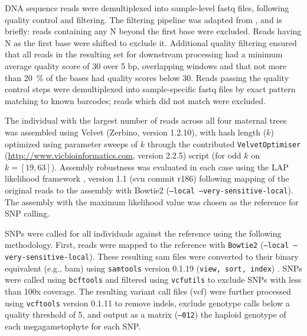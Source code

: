 \documentclass[smallextended]{svjour3}
\begin{document}
DNA sequence reads were demultiplexed into sample-level fastq files, following
quality control and filtering.  The filtering pipeline was adapted from
\citep{Friedline:2012fm}, and is briefly: reads containing any N beyond the
first base were excluded. Reads having N as the first base were shifted to
exclude it.  Additional quality filtering ensured that all reads in the
resulting set for downstream processing had a minimum average quality score of
30 over 5 bp, overlapping windows and that not more than \SI{20}{\percent} of
the bases had quality scores below 30. Reads passing the quality control steps
were demultiplexed into sample-specific fastq files by exact pattern matching to
known barcodes; reads which did not match were excluded.

The individual with the largest number of reads across all four maternal trees
was assembled using Velvet (Zerbino, version 1.2.10), with hash length ($k$)
optimized using parameter sweeps of $k$ through the contributed
\texttt{VelvetOptimiser} (\url{http://www.vicbioinformatics.com}, version 2.2.5)
script (for odd $k$ on $k=[19,63]$).  Assembly robustness was evaluated in each
case using the LAP likelihood framework \citep{Ghodsi:2013bc}, version 1.1 (svn
commit r186) following mapping of the original reads to the assembly with
Bowtie2 \citep{Langmead:2012jh} (\texttt{--local --very-sensitive-local}).  The
assembly with the maximum likelihood value was chosen as the reference for SNP
calling.

SNPs were called for all individuals against the reference using the following
methodology.  First, reads were mapped to the reference with \texttt{Bowtie2}
(\texttt{--local --very-sensitive-local}).  These resulting sam files were
converted to their binary equivalent (e.g., bam) using \texttt{samtools} version
0.1.19 (\texttt{view, sort, index}) \citep{Li:2009ka}.  SNPs were called using
\texttt{bcftools} and filtered using \texttt{vcfutils} to exclude SNPs with less
than 100x coverage. The resulting variant call files (vcf) were further
processed using \texttt{vcftools} version 0.1.11 \citep{Danecek:2011gz} to
remove indels, exclude genotype calls below a quality threshold of 5, and output
as a matrix (\texttt{--012}) the haploid genotype of each megagametophyte for
each SNP.
\end{document}
